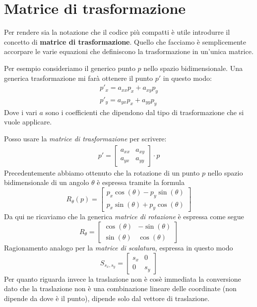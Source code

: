 \section{Matrice di trasformazione}
Per rendere sia la notazione che il codice pi\`u compatti \`e utile introdurre il concetto
di \textbf{matrice di trasformazione}. Quello che facciamo \`e semplicemente accorpare le
varie equazioni che definiscono la trasformazione in un'unica matrice.

Per esempio consideriamo il generico punto $p$ nello spazio bidimensionale. Una generica
trasformazione mi far\`a ottenere il punto $p'$ in questo modo:
\begin{gather*}
	p'_x = a_{xx} p_x + a_{xy} p_y \\
	p'_y = a_{yx} p_x + a_{yy} p_y
\end{gather*}
Dove i vari $a$ sono i coefficienti che dipendono dal tipo di trasformazione che si
vuole applicare.

Posso usare la \emph{matrice di trasformazione} per scrivere:
\begin{gather*}
	p' = \begin{bmatrix}
		a_{xx} & a_{xy} \\
		a_{yx} & a_{yy}
	\end{bmatrix} \cdot p
\end{gather*}
Precedentemente abbiamo ottenuto che la rotazione di un punto $p$ nello spazio bidimensionale
di un angolo $\theta$ \`e espressa tramite la formula
\[
	R_\theta(p) = \begin{bmatrix}
		p_x \cos(\theta) - p_y \sin(\theta) \\
		p_x \sin(\theta) + p_y \cos(\theta)
	\end{bmatrix}
\]
Da qui ne ricaviamo che la generica \emph{matrice di rotazione} \`e espressa come segue
\[
	R_\theta = \begin{bmatrix}
		\cos(\theta) & -\sin(\theta) \\
		\sin(\theta) & \cos(\theta)
	\end{bmatrix}
\]
Ragionamento analogo per la \emph{matrice di scalatura}, espressa in questo modo
\[
	S_{s_x, s_y} = \begin{bmatrix}
		s_x & 0   \\
		0   & s_y
	\end{bmatrix}
\]
Per quanto riguarda invece la traslazione non \`e cos\`e immediata la conversione dato
che la traslazione non \`e una combinazione lineare delle coordinate (non dipende da dove \`e
il punto), dipende solo dal vettore di traslazione.

